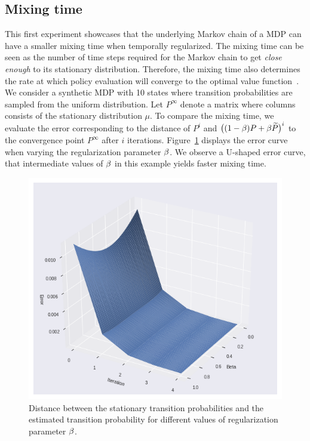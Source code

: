 \subsection{Mixing time}
This first experiment showcases that the underlying Markov chain of a MDP can have a smaller mixing time when temporally regularized. The mixing time can be seen as the number of time steps required for the Markov chain to get \emph{close enough} to its stationary distribution. Therefore, the mixing time also determines the rate at which policy evaluation will converge to the optimal value function~\cite{baxter2001infinite}. 
We consider a synthetic MDP with 10 states where transition probabilities are sampled from the uniform distribution. Let $P^{\infty}$ denote a matrix where columns consists of the stationary distribution $\mu$. To compare the mixing time, we evaluate the error corresponding to the distance of $P^i$ and $\big((1-\beta)P+\beta \widetilde{P}\big)^i$ to the convergence point $P^{\infty}$ after $i$ iterations.
%
Figure~\ref{fig:mixing} displays the error curve when varying the regularization parameter $\beta$. We observe a U-shaped error curve, that intermediate values of $\beta$ in this example yields faster mixing time.
\begin{figure}
    \centering
    \includegraphics[scale=0.5]{fig/Markov_mixing.png}
    \caption{Distance between the stationary transition probabilities and the estimated transition probability for different values of regularization parameter $\beta$.}
    \label{fig:mixing}
\end{figure}
